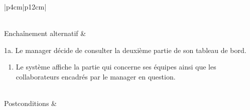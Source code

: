 \begin{longtable}{|p{4cm}|p{12cm}|}
\begin{minipage}[t]{\linewidth}
                            \end{minipage}
                        \\
                        \hline
                        Enchaînement alternatif & 
                            \begin{minipage}[t]{\linewidth}
                            1a. Le manager décide de consulter la deuxième partie de son tableau de bord.
                             \begin{enumerate}[nosep,after=\strut]
                                      \item Le système affiche la partie qui concerne ses équipes ainsi que les collaborateurs encadrés par le manager en question.
                                \end{enumerate}
                            \end{minipage}
                        \\
                        
                        \hline
                        Postconditions &   \\
                        \hline
                    \caption{Description du cas d'utilisation « Consulter tableau de bord manager »}\\
            \end{longtable}        
            
